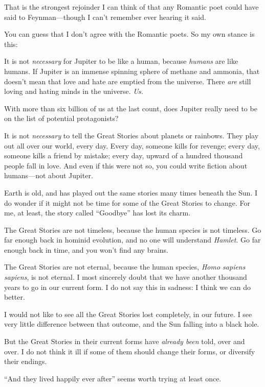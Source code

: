 {
 That is the strongest rejoinder I can think of that any Romantic
poet could have said to Feynman---though I can't
remember ever hearing it said.}

{
 You can guess that I don't agree with the Romantic
poets. So my own stance is this:}

{
 It is not \textit{necessary} for Jupiter to be like a human,
because \textit{humans} are like humans. If Jupiter is an immense
spinning sphere of methane and ammonia, that doesn't
mean that love and hate are emptied from the universe. There
\textit{are} still loving and hating minds in the universe.
\textit{Us.}}

{
 With more than six billion of us at the last count, does Jupiter
really need to be on the list of potential protagonists?}

{
 It is not \textit{necessary} to tell the Great Stories about
planets or rainbows. They play out all over our world, every day. Every
day, someone kills for revenge; every day, someone kills a friend by
mistake; every day, upward of a hundred thousand people fall in love.
And even if this were not so, you could write fiction about
humans---not about Jupiter.}

{
 Earth is old, and has played out the same stories many times
beneath the Sun. I do wonder if it might not be time for some of the
Great Stories to change. For me, at least, the story called
``Goodbye'' has lost its charm.}

{
 The Great Stories are not timeless, because the human species is
not timeless. Go far enough back in hominid evolution, and no one will
understand \textit{Hamlet}. Go far enough back in time, and you
won't find any brains.}

{
 The Great Stories are not eternal, because the human species,
\textit{Homo sapiens sapiens}, is not eternal. I most sincerely doubt
that we have another thousand years to go in our current form. I do not
say this in sadness: I think we can do better.}

{
 I would not like to see all the Great Stories lost completely, in
our future. I see very little difference between that outcome, and the
Sun falling into a black hole.}

{
 But the Great Stories in their current forms have \textit{already
been} told, over and over. I do not think it ill if some of them should
change their forms, or diversify their endings.}

{
 ``And they lived happily ever
after'' seems worth trying at least once.}

